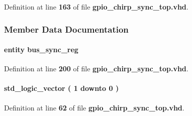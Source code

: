 Definition at line {\bf 163} of file {\bf gpio\+\_\+chirp\+\_\+sync\+\_\+top.\+vhd}.



\subsubsection{Member Data Documentation}
\paragraph[{bus\+\_\+sync\+\_\+reg0}]{ {\bfseries \textcolor{keywordflow}{entity}\textcolor{vhdlchar}{ }\textcolor{vhdlchar}{bus\+\_\+sync\+\_\+reg}\textcolor{vhdlchar}{ }} \hspace{0.3cm}{\ttfamily [Instantiation]}}\label{classgpio__chirp__sync__top_1_1arch_ab4c40aac4a7c660b0e025e7682ee4bb4}


Definition at line {\bf 200} of file {\bf gpio\+\_\+chirp\+\_\+sync\+\_\+top.\+vhd}.

\paragraph[{ch\+\_\+en\+\_\+sync}]{ {\bfseries \textcolor{comment}{std\+\_\+logic\+\_\+vector}\textcolor{vhdlchar}{ }\textcolor{vhdlchar}{(}\textcolor{vhdlchar}{ }\textcolor{vhdlchar}{ } \textcolor{vhdldigit}{1} \textcolor{vhdlchar}{ }\textcolor{keywordflow}{downto}\textcolor{vhdlchar}{ }\textcolor{vhdlchar}{ } \textcolor{vhdldigit}{0} \textcolor{vhdlchar}{ }\textcolor{vhdlchar}{)}\textcolor{vhdlchar}{ }} \hspace{0.3cm}{\ttfamily [Signal]}}\label{classgpio__chirp__sync__top_1_1arch_a918590d01aaf44080b7f374076babcfb}


Definition at line {\bf 62} of file {\bf gpio\+\_\+chirp\+\_\+sync\+\_\+top.\+vhd}.

